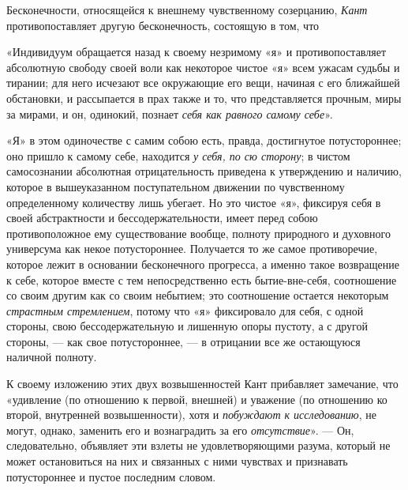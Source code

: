 Бесконечности, относящейся к внешнему чувственному созерцанию,
{\em Кант} противопоставляет другую бесконечность,
состоящую в том, что

«Индивидуум обращается назад к своему незримому «я» и противопоставляет
абсолютную свободу своей воли как некоторое чистое «я» всем ужасам судьбы и
тирании; для него исчезают все окружающие его вещи, начиная с его ближайшей
обстановки, и рассыпается в прах также и то, что представляется прочным,
миры за мирами, и он, одинокий, познает {\em себя как
равного самому себе}».

«Я» в этом одиночестве с самим собою есть, правда, достигнутое
потустороннее; оно пришло к самому себе, находится
{\em у себя, по сю сторону}; в чистом самосознании
абсолютная отрицательность приведена к утверждению и наличию, которое в
вышеуказанном поступательном движении по чувственному определенному
количеству лишь убегает. Но это чистое «я», фиксируя себя в своей
абстрактности и бессодержательности, имеет перед собою противоположное ему
существование вообще, полноту природного и духовного универсума как некое
потустороннее. Получается то же самое противоречие, которое лежит в
основании бесконечного прогресса, а именно такое возвращение к себе,
которое вместе с тем непосредственно есть бытие-вне-себя, соотношение со
своим другим как со своим небытием; это соотношение остается некоторым
{\em страстным стремлением}, потому что «я» фиксировало
для себя, с одной стороны, свою бессодержательную и лишенную опоры пустоту,
а с другой стороны, — как свое потустороннее, — в отрицании все же
остающуюся наличной полноту.

К своему изложению этих двух возвышенностей Кант прибавляет замечание, что
«удивление (по отношению к первой, внешней) и уважение (по отношению ко
второй, внутренней возвышенности), хотя и
{\em побуждают к исследованию}, не могут, однако,
заменить его и вознаградить за его
{\em отсутствие}». — Он, следовательно,
объявляет эти взлеты не удовлетворяющими разума, который не может
остановиться на них и связанных с ними чувствах и признавать потустороннее
и пустое последним словом.

